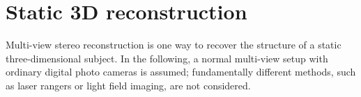 
\clearpage
\section{Static 3D reconstruction} %

Multi-view stereo reconstruction is one way to recover the structure of a static three-dimensional subject.
In the following, a normal multi-view setup with ordinary digital photo cameras is assumed;
fundamentally different methods, such as laser rangers or light field imaging, are not considered.
















